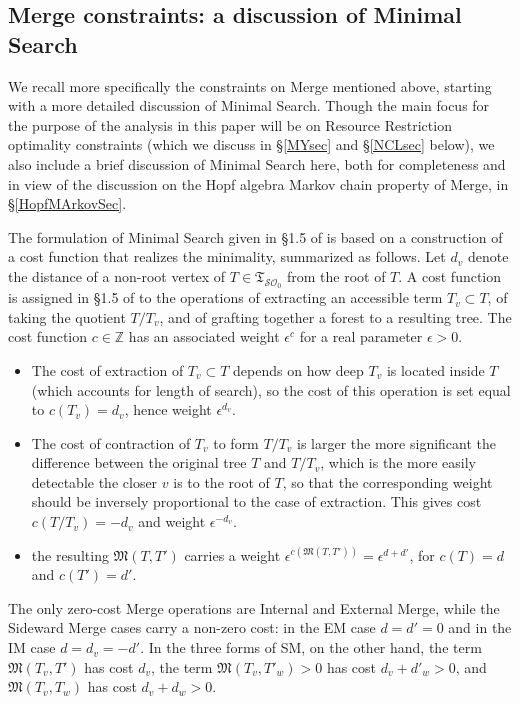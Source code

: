 \documentclass[12pt]{amsart}
\numberwithin{equation}{section}
\def\Z{{\mathbb Z}}
\def\cO{{\mathcal O}}
\def\cS{{\mathcal S}}
\def\fM{{\mathfrak M}}
\def\fT{{\mathfrak T}}
\begin{document}
\smallskip
\subsection{Merge constraints: a discussion of Minimal Search}  \label{MSsev}

We recall more specifically the constraints on Merge mentioned above, 
starting with a more detailed discussion of Minimal Search. Though the
main focus for the purpose of the analysis in this paper will be on
Resource Restriction optimality constraints (which we
discuss in \S \ref{MYsec} and \S \ref{NCLsec} below), we also 
include a brief  discussion of Minimal Search here, both for completeness
and in view of the discussion on the Hopf algebra Markov chain property of
Merge, in \S \ref{HopfMArkovSec}. 

\smallskip

The formulation of Minimal Search given in \S 1.5 of \cite{MCB} is based on a
construction of a cost function that realizes the minimality, summarized as follows. 
Let $d_v$ denote the distance of a non-root vertex of $T\in \fT_{\cS\cO_0}$
from the root of $T$. A cost function is assigned in \S 1.5 of \cite{MCB} to the 
operations of extracting an accessible term $T_v \subset T$, of taking the
quotient $T/T_v$, and of grafting together a forest to a resulting tree.
The cost function $c\in \Z$ has an associated weight $\epsilon^{c}$ for a
real parameter $\epsilon>0$. 
\begin{itemize}
\item The cost of extraction of $T_v \subset T$ depends on how deep $T_v$ is
located inside $T$ (which accounts for length of search), so the cost of this
operation is set equal to $c(T_v)=d_v$, hence weight $\epsilon^{d_v}$.
\item The cost of contraction of $T_v$ to form $T/T_v$ is larger the more
significant the difference between the original tree $T$ and $T/T_v$, which
is the more easily detectable the closer $v$ is to the root of $T$, so that
the corresponding weight should be inversely proportional to the case
of extraction. This gives cost $c(T/T_v)=-d_v$ and weight $\epsilon^{-d_v}$.
\item the resulting $\fM(T, T')$ carries a weight $\epsilon^{c(\fM(T,T'))}=\epsilon^{d+d'}$,
for $c(T)=d$ and $c(T')=d'$. 
 \end{itemize}
 The only zero-cost Merge operations are Internal and External Merge, while the
 Sideward Merge cases carry a non-zero cost: in the EM case $d=d'=0$ and
 in the IM case $d=d_v=-d'$. In the three forms of SM, on the other hand, 
 the term $\fM(T_v, T')$ has cost $d_v$, the term $\fM(T_v,T'_w)>0$ has cost
 $d_v+d'_{w}>0$, and $\fM(T_v,T_w)$ has cost $d_v+d_w>0$.
 
\end{document}
